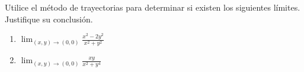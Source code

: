 Utilice el método de trayectorias para determinar si existen los siguientes límites. Justifique su conclusión.
\begin{enumerate}
    \item $\displaystyle\lim_{(x,y)\to(0,0)} \frac{x^2 - 2y^2}{x^2 + y^2}$
    \item $\displaystyle\lim_{(x,y)\to(0,0)} \frac{xy}{x^2 + y^4}$
\end{enumerate}
